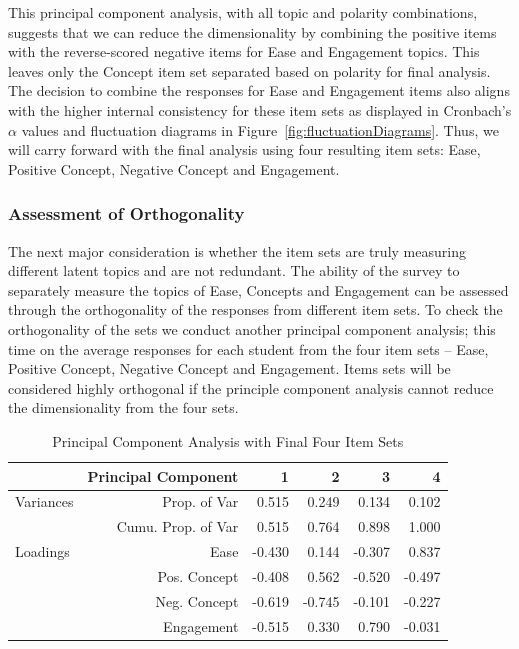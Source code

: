 \documentclass{article}\usepackage[]{graphicx}\usepackage[]{color}
\begin{document}
This principal component analysis, with all topic and polarity combinations, suggests that we can reduce the dimensionality by combining the positive items with the reverse-scored negative items for Ease and Engagement topics.  This leaves only the Concept item set separated based on polarity for final analysis.  The decision to combine the responses for Ease and Engagement items also aligns with the higher internal consistency for these item sets as displayed in Cronbach's $\alpha$ values and fluctuation diagrams in Figure~\ref{fig:fluctuationDiagrams}. Thus, we will carry forward with the final analysis using four resulting item sets: Ease, Positive Concept, Negative Concept and Engagement.  

\subsubsection{Assessment of Orthogonality} 

The next major consideration is whether the item sets are truly measuring different latent topics and are not redundant. The ability of the survey to separately measure the topics of Ease, Concepts and Engagement can be assessed through the orthogonality of the responses from different item sets.  To check the orthogonality of the sets we conduct another principal component analysis; this time on the average responses for each student from the four item sets -- Ease, Positive Concept, Negative Concept and Engagement.  Items sets will be considered highly orthogonal if the principle component analysis cannot reduce the dimensionality from the four sets. \\  




\begin{table}[ht]
\centering
\begin{tabular}{lrrrrr}
\hline 
& Principal Component & 1 & 2 & 3 & 4 \\ 
\hline
Variances \hspace{.1in} & Prop. of Var & 0.515 & 0.249  & 0.134 & 0.102  \\
& Cumu. Prop. of Var & 0.515 & 0.764  & 0.898 & 1.000  \\
\hline
Loadings & Ease & -0.430 & 0.144 & -0.307 & 0.837\\
& Pos. Concept &  -0.408 & 0.562 & -0.520 & -0.497\\
& Neg. Concept &  -0.619 & -0.745 & -0.101 & -0.227\\
& Engagement &  -0.515 & 0.330 & 0.790 & -0.031\\
\hline
\end{tabular}
\caption{Principal Component Analysis with Final Four Item Sets} 
\label{pctable}
\end{table}
\end{document}
